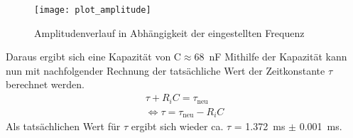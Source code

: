 \begin{figure}
  \centering
  \texttt{[image: plot\_amplitude]}
  \caption{Amplitudenverlauf in Abhängigkeit der eingestellten Frequenz}
  \label{fig:plot_amplitude}
\end{figure}
Daraus ergibt sich eine Kapazität von C$\approx$\SI{68}{\nano\farad}
Mithilfe der Kapazität kann nun mit nachfolgender Rechnung der tatsächliche Wert der Zeitkonstante $\tau$ berechnet werden.
\begin{equation*}
  \begin{split}
    \tau + R_i C = \tau_\text{neu}\\
	\Leftrightarrow \tau = \tau_\text{neu} - R_i C
  \end{split}
\end{equation*}
Als tatsächlichen Wert für $\tau$ ergibt sich wieder ca. $\tau$ = \SI{1.372}{\milli\second} $\pm$ \SI{0.001}{\milli\second}.
